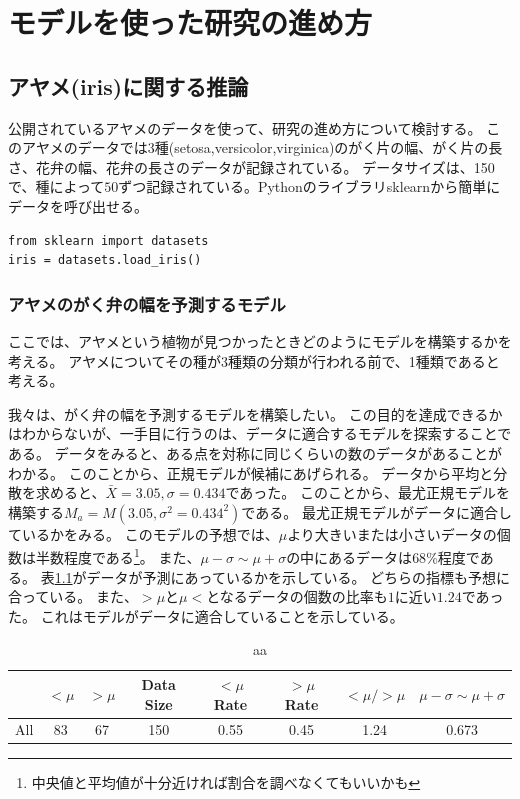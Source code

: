 \chapter{モデルを使った研究の進め方}


\section{アヤメ(iris)に関する推論}
公開されているアヤメのデータを使って、研究の進め方について検討する。
このアヤメのデータでは$3$種(setosa,versicolor,virginica)のがく片の幅、がく片の長さ、花弁の幅、花弁の長さのデータが記録されている。
データサイズは、150で、種によって$50$ずつ記録されている。Pythonのライブラリsklearnから簡単にデータを呼び出せる。
\begin{lstlisting}
from sklearn import datasets
iris = datasets.load_iris()
\end{lstlisting}

\subsection{アヤメのがく弁の幅を予測するモデル}
ここでは、アヤメという植物が見つかったときどのようにモデルを構築するかを考える。
アヤメについてその種が3種類の分類が行われる前で、1種類であると考える。

我々は、がく弁の幅を予測するモデルを構築したい。
この目的を達成できるかはわからないが、一手目に行うのは、データに適合するモデルを探索することである。
データをみると、ある点を対称に同じくらいの数のデータがあることがわかる。
このことから、正規モデルが候補にあげられる。
データから平均と分散を求めると、$\bar{X}=3.05,\sigma=0.434$であった。
このことから、最尤正規モデルを構築する$M_a=M(3.05,\sigma^2=0.434^2)$である。
最尤正規モデルがデータに適合しているかをみる。
このモデルの予想では、$\mu$より大きいまたは小さいデータの個数は半数程度である\footnote{中央値と平均値が十分近ければ割合を調べなくてもいいかも}。
また、$\mu-\sigma \sim \mu+\sigma$の中にあるデータは$68\%$程度である。
表\ref{table:all_spael_width_table}がデータが予測にあっているかを示している。
どちらの指標も予想に合っている。
また、$>\mu$と$\mu<$となるデータの個数の比率も$1$に近い$1.24$であった。
これはモデルがデータに適合していることを示している。
\begin{table}[h]
    \caption{aa}
    \label{table:all_spael_width_table}
    \centering
    \begin{tabular}{lccccccc}
        \hline
        {} &  $<\mu$ &  $>\mu$ &  Data Size &  $<\mu$ Rate &  $>\mu$ Rate &  $<\mu/>\mu$ & $\mu-\sigma\sim\mu+\sigma$\\
        \hline
        All    &    83 &    67 &        150 &       0.55 &       0.45 &       1.24 & 0.673\\
        \hline
    \end{tabular}
\end{table}

